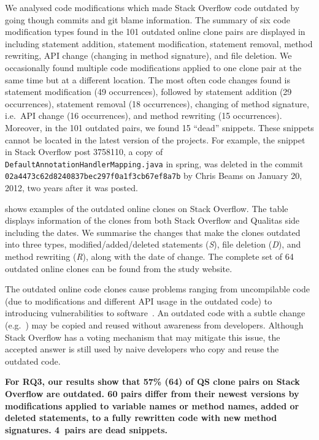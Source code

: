 \documentclass[10pt,journal,compsoc]{IEEEtran}
\begin{document}
We analysed code modifications which made Stack Overflow code outdated by going
though commits and git blame information. The summary of six code modification
types found in the 101 outdated online clone pairs are displayed in
 including statement addition, statement modification,
statement removal, method rewriting, API change (changing in method signature),
and file deletion. We occasionally found multiple code modifications applied to
one clone pair at the same time but at a different location. The most often
code changes found is statement modification (49 occurrences), followed by statement
addition (29 occurrences), statement removal (18 occurrences), changing of method
signature, i.e.~API change (16 occurrences), and method rewriting (15 occurrences).
Moreover, in the 101 outdated pairs, we found 15 ``dead'' snippets. These snippets
cannot be located in the latest version of the projects. For example,
the snippet in Stack Overflow post 3758110, a copy of
{\small{\texttt{DefaultAnnotationHandlerMapping.java}}} in
\textsf{spring}, was deleted in the commit
{\small{\texttt{02a4473c62d8240837bec297f0a1f3cb67ef8a7b}}} by Chris
Beams on January 20, 2012, two years after it was
posted. 

 shows examples of the outdated online
clones on Stack Overflow. The table displays information of the clones
from both Stack Overflow and Qualitas side including the dates. We
summarise the changes that make the clones outdated into three types,
modified/added/deleted statements (\textit{S}), file deletion
(\textit{D}), and method rewriting (\textit{R}), along with the date
of change. The complete set of 64 outdated online clones can be found
from the study website.

The outdated online code clones cause problems ranging from
uncompilable code (due to modifications and different API usage in the
outdated code) to introducing vulnerabilities to
software~\cite{Xia2014}. An outdated code with a subtle change
(e.g.~) may be copied and reused without
awareness from developers. Although Stack Overflow has a voting
mechanism that may mitigate this issue, the accepted answer is still
used by naive developers who copy and reuse the outdated code.

\textbf{For RQ3, our results show that 57\% (64) of QS clone
	pairs on Stack Overflow are outdated. 60 pairs differ from their
	newest versions by modifications applied to variable names or method
	names, added or deleted statements, to a fully rewritten code with
	new method signatures. 4~pairs are dead
	snippets.}
\end{document}
